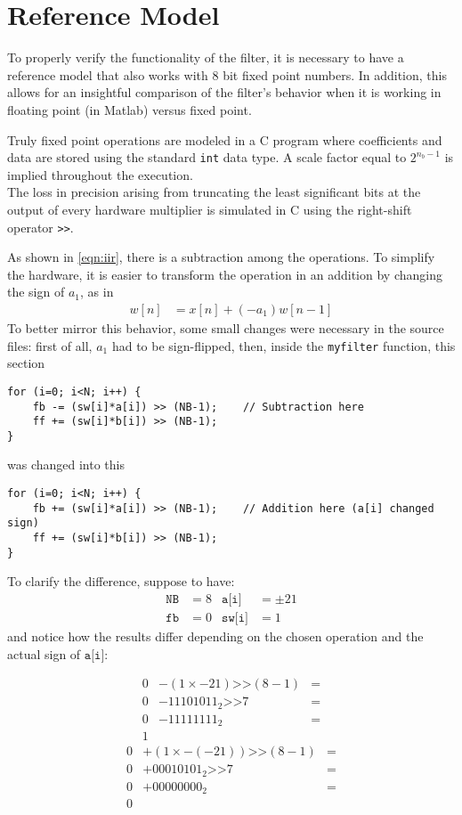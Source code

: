 \section{Reference Model}
To properly verify the functionality of the filter, it is necessary to have a reference model that also works with 8 bit fixed point numbers. In addition, this allows for an insightful comparison of the filter's behavior when it is working in floating point (in Matlab) versus fixed point.


Truly fixed point operations are modeled in a C program where coefficients and data are stored using the standard \texttt{int} data type. A scale factor equal to $2^{n_b-1}$ is implied throughout the execution.\\
The loss in precision arising from truncating the least significant bits at the output of every hardware multiplier is simulated in C using the right-shift operator \texttt{>>}.

As shown in \autoref{eqn:iir}, there is a subtraction among the operations. To simplify the hardware, it is easier to transform the operation in an addition by changing the sign of $a_1$, as in
\begin{align}
	w[n] &= x[n] + (- a_1) w[n-1]
\end{align}
To better mirror this behavior, some small changes were necessary in the source files: first of all, $a_1$ had to be sign-flipped, then, inside the \texttt{myfilter} function, this section
\begin{Verbatim}
for (i=0; i<N; i++) {
	fb -= (sw[i]*a[i]) >> (NB-1);    // Subtraction here
	ff += (sw[i]*b[i]) >> (NB-1);
}
\end{Verbatim}
was changed into this
\begin{Verbatim}
for (i=0; i<N; i++) {
	fb += (sw[i]*a[i]) >> (NB-1);    // Addition here (a[i] changed sign)
	ff += (sw[i]*b[i]) >> (NB-1);
}
\end{Verbatim}
To clarify the difference, suppose to have:
\begin{align*}
	\texttt{NB} &= 8 & \texttt{a[i]} &= \pm21 \\
	\texttt{fb} &= 0 & \texttt{sw[i]} &= 1
\end{align*}
and notice how the results differ depending on the chosen operation and the actual sign of $\texttt{a[i]}$:
\setlength{\columnseprule}{0.4pt}
\begin{multicols}{2}
	\noindent
	\begin{align*}
		0 &- (1 \times -21) \texttt{>>} (8 - 1) &= \\
		0 &- 11101011_2 \texttt{>>} 7 &= \\
		0 &- 11111111_2 &= \\
		1&
	\end{align*}
	\begin{align*}
		0 &+ (1 \times -(-21)) \texttt{>>} (8 - 1) &= \\
		0 &+ 00010101_2 \texttt{>>} 7 &= \\
		0 &+ 00000000_2 &= \\
		0&
	\end{align*}
\end{multicols}
